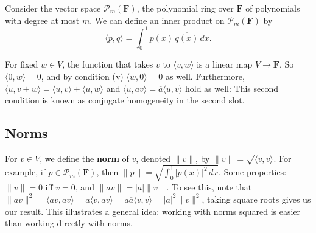 \begin{example}
    Consider the vector space $\mathcal{P} _m(\mathbf F)$, the polynomial ring over $\mathbf F$ of polynomials with degree at most $m$. We can define an inner product on $\mathcal{P} _m(\mathbf F)$ by \[
        \langle p,q \rangle =\int_{0}^{1} p(x)\,\overline{q(x)} \, dx.
    \] 
\end{example}
For fixed $w\in V$, the function that takes $v$ to $\langle v,w \rangle $ is a linear map $V\to \mathbf F$. So $\langle 0,w \rangle =0$, and by condition (v) $\langle w,0 \rangle =0$ as well. Furthermore, $\langle u,v+w \rangle =\langle u,v \rangle +\langle u,w \rangle $ and $\langle u,av \rangle =\overline{a}\langle u,v \rangle $ hold as well: This second condition is known as conjugate homogeneity in the second slot.
\subsection{Norms}
For $v\in V$, we define the \textbf{norm} of $v$, denoted $\|v\|$, by $\|v\|=\sqrt{\langle v,v \rangle } $. For example, if $p\in \mathcal{P} _m(\mathbf F)$, then $\| p\|=\sqrt{\int_{0}^{1} |p(x)|^2 \, dx} $. Some properties: $\|v\|=0$ iff $v=0$, and $\|av\|=|a|\|v\|$. To see this, note that $\|av\|^2=\langle av,av \rangle =a\langle v,av \rangle =a \overline{a}\langle v,v \rangle =|a|^2\|v\|^2$, taking square roots gives us our result. This illustrates a general idea: working with norms squared is easier than working directly with norms.

